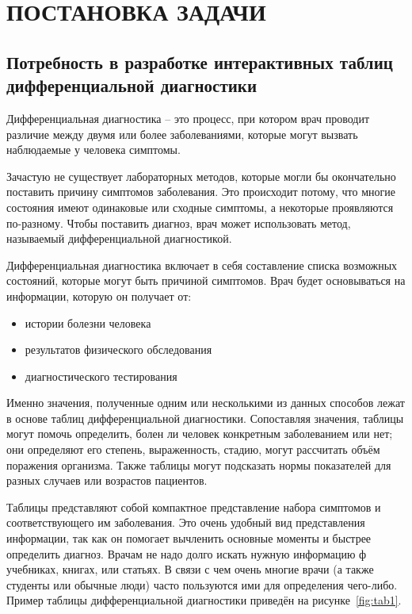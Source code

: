 \section{ПОСТАНОВКА ЗАДАЧИ}

\subsection{Потребность в разработке интерактивных таблиц дифференциальной диагностики}

Дифференциальная диагностика – это процесс, при котором врач проводит различие между двумя или более заболеваниями, которые могут вызвать наблюдаемые у человека симптомы.

Зачастую не существует лабораторных методов, которые могли бы окончательно поставить причину симптомов заболевания. Это происходит потому, что многие состояния имеют одинаковые или сходные симптомы, а некоторые проявляются по-разному. Чтобы поставить диагноз, врач может использовать метод, называемый дифференциальной диагностикой.

Дифференциальная диагностика включает в себя составление списка возможных состояний, которые могут быть причиной симптомов. Врач будет основываться на информации, которую он получает от:

\begin{itemize}
    \item истории болезни человека
    \item результатов физического обследования
    \item диагностического тестирования
\end{itemize}

Именно значения, полученные одним или несколькими из данных способов лежат в основе таблиц дифференциальной диагностики. Сопоставляя значения, таблицы могут помочь определить, болен ли человек конкретным заболеванием или нет; они определяют его степень, выраженность, стадию, могут рассчитать объём поражения организма. Также таблицы могут подсказать нормы показателей для разных случаев или возрастов пациентов.

Таблицы представляют собой компактное представление набора симптомов и соответствующего им заболевания. Это очень удобный вид представления информации, так как он помогает вычленить основные моменты и быстрее определить диагноз. Врачам не надо долго искать нужную информацию ф учебниках, книгах, или статьях. В связи с чем очень многие врачи (а также студенты или обычные люди) часто пользуются ими для определения чего-либо. Пример таблицы дифференциальной диагностики приведён на рисунке~\ref{fig:tab1}.

